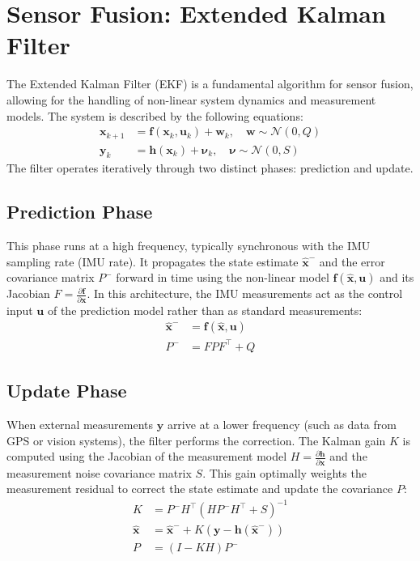 \documentclass[10pt, a4paper]{report}
\begin{document}
\section{Sensor Fusion: Extended Kalman Filter}

The Extended Kalman Filter (EKF) is a fundamental algorithm for sensor fusion, allowing for the handling of non-linear system dynamics and measurement models. The system is described by the following equations:
\begin{align}
\mathbf{x}_{k+1} &= \mathbf{f}(\mathbf{x}_k, \mathbf{u}_k) + \mathbf{w}_k, \quad \mathbf{w} \sim \mathcal{N}(0, Q) \\
\mathbf{y}_k &= \mathbf{h}(\mathbf{x}_k) + \boldsymbol{\nu}_k, \quad \boldsymbol{\nu} \sim \mathcal{N}(0, S)
\end{align}
The filter operates iteratively through two distinct phases: prediction and update.
\subsection{Prediction Phase}
This phase runs at a high frequency, typically synchronous with the IMU sampling rate (IMU rate). It propagates the state estimate $\hat{\mathbf{x}}^-$ and the error covariance matrix $P^-$ forward in time using the non-linear model $\mathbf{f}(\hat{\mathbf{x}}, \mathbf{u})$ and its Jacobian $F = \frac{\partial \mathbf{f}}{\partial \mathbf{x}}$. In this architecture, the IMU measurements act as the control input $\mathbf{u}$ of the prediction model rather than as standard measurements:
\begin{align}
\hat{\mathbf{x}}^- &= \mathbf{f}(\hat{\mathbf{x}}, \mathbf{u}) \\
P^- &= F P F^\top + Q
\end{align}
\subsection{Update Phase}
When external measurements $\mathbf{y}$ arrive at a lower frequency (such as data from GPS or vision systems), the filter performs the correction. The Kalman gain $K$ is computed using the Jacobian of the measurement model $H = \frac{\partial \mathbf{h}}{\partial \mathbf{x}}$ and the measurement noise covariance matrix $S$. This gain optimally weights the measurement residual to correct the state estimate and update the covariance $P$:
\begin{align}
K &= P^- H^\top \left(H P^- H^\top + S\right)^{-1} \\
\hat{\mathbf{x}} &= \hat{\mathbf{x}}^- + K \left(\mathbf{y} - \mathbf{h}(\hat{\mathbf{x}}^-)\right) \\
P &= (I - K H) P^-
\end{align}
\end{document}
